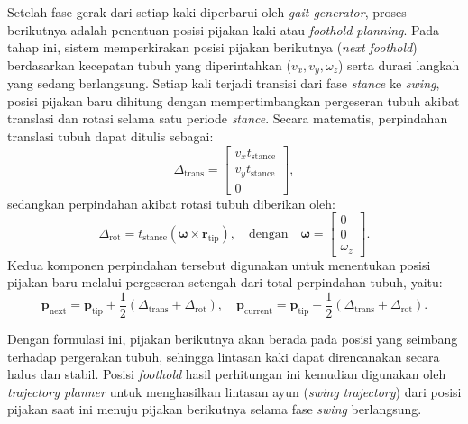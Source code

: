 Setelah fase gerak dari setiap kaki diperbarui oleh \textit{gait generator},
proses berikutnya adalah penentuan posisi pijakan kaki atau \textit{foothold
planning}. Pada tahap ini, sistem memperkirakan posisi pijakan berikutnya
(\textit{next foothold}) berdasarkan kecepatan tubuh yang diperintahkan (\(v_x,
v_y, \omega_z\)) serta durasi langkah yang sedang berlangsung. Setiap kali
terjadi transisi dari fase \textit{stance} ke \textit{swing}, posisi pijakan
baru dihitung dengan mempertimbangkan pergeseran tubuh akibat translasi dan
rotasi selama satu periode \textit{stance}. Secara matematis, perpindahan
translasi tubuh dapat ditulis sebagai:
\begin{equation}
\Delta_{\text{trans}} = 
\begin{bmatrix}
v_x t_{\text{stance}} \\
v_y t_{\text{stance}} \\
0
\end{bmatrix},
\end{equation}
sedangkan perpindahan akibat rotasi tubuh diberikan oleh:
\begin{equation}
\Delta_{\text{rot}} = 
t_{\text{stance}} (\boldsymbol{\omega} \times \mathbf{r}_{\text{tip}}),
\quad \text{dengan} \quad 
\boldsymbol{\omega} = 
\begin{bmatrix}
0 \\ 0 \\ \omega_z
\end{bmatrix}.
\end{equation}
Kedua komponen perpindahan tersebut digunakan untuk menentukan posisi pijakan
baru melalui pergeseran setengah dari total perpindahan tubuh, yaitu:
\begin{equation}
\mathbf{p}_{\text{next}} = 
\mathbf{p}_{\text{tip}} + 
\frac{1}{2} (\Delta_{\text{trans}} + \Delta_{\text{rot}}),
\quad
\mathbf{p}_{\text{current}} = 
\mathbf{p}_{\text{tip}} - 
\frac{1}{2} (\Delta_{\text{trans}} + \Delta_{\text{rot}}).
\end{equation}

Dengan formulasi ini, pijakan berikutnya akan berada pada posisi yang seimbang
terhadap pergerakan tubuh, sehingga lintasan kaki dapat direncanakan secara
halus dan stabil. Posisi \textit{foothold} hasil perhitungan ini kemudian
digunakan oleh \textit{trajectory planner} untuk menghasilkan lintasan ayun
(\textit{swing trajectory}) dari posisi pijakan saat ini menuju pijakan
berikutnya selama fase \textit{swing} berlangsung.

